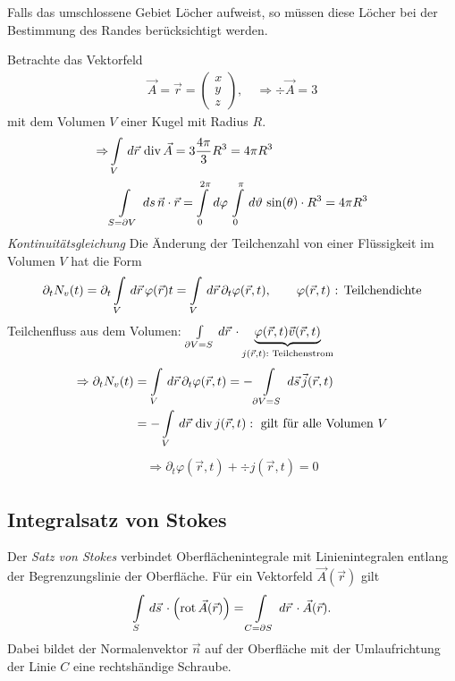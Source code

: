 \begin{Bemerkung}
Falls das umschlossene Gebiet Löcher aufweist, so müssen diese Löcher bei der
Bestimmung des Randes berücksichtigt werden.
\end{Bemerkung}

\begin{Beispiel}
Betrachte das Vektorfeld
\begin{align*}
\vec{A} = \vec{r} = \begin{pmatrix}x\\y\\z\end{pmatrix},\quad \Rightarrow \div
\vec{A} = 3
\end{align*}
mit dem Volumen $V$ einer Kugel mit Radius $R$.
\begin{align*}
\Rightarrow & \int \limits_{V} \,d\vec{r}\,  \operatorname{div} \vec{A} = 3\frac{4\pi}{3} R^3
= 4\pi R^3\\
& \int \limits_{S = \partial V} \,ds\, \vec{n}\cdot\vec{r} = \int \limits_{0}^{2\pi}\,d\varphi\, \int
\limits_{0}^{\pi}\,d\vartheta\, \sin(\theta) \cdot R^3 = 4\pi R^3
\end{align*}
{\em Kontinuitätsgleichung} Die Änderung der Teilchenzahl von einer Flüssigkeit
im Volumen $V$ hat die Form
\begin{align*}
\partial_t N_v(t) = \partial_t \int \limits_{V} \,d\vec{r}\, \varphi(\vec{r})t
= \int \limits_{V} \,d\vec{r}\, \partial_t \varphi(\vec{r}, t), \qquad
\varphi(\vec{r}, t) \text{ : Teilchendichte}
\end{align*}
Teilchenfluss aus dem Volumen: $\int \limits_{\partial V = S}\,d\vec{r}\, \cdot
\underbrace{\varphi(\vec{r},t)\vec{v}(\vec{r},t)}_{j(\vec{r},t) : \text{
Teilchenstrom}}$
\begin{align*}
\Rightarrow \partial_t N_v(t) &= \int \limits_{V} \,d\vec{r}\,
\partial_t\varphi(\vec{r},t) = -\int \limits_{\partial V = S}\,d\vec{s}\,
\vec{j}(\vec{r},t) \\
&= -\int \limits_{V}\,d\vec{r}\, \operatorname{div} j(\vec{r},t) : \text{
gilt für alle Volumen } V
\end{align*}
\begin{align*}
\Rightarrow \partial_t \varphi(\vec{r},t) + \div j(\vec{r},t) = 0
\end{align*}
\end{Beispiel}

\subsection{Integralsatz von Stokes}
Der {\em Satz von Stokes} verbindet Oberflächenintegrale mit Linienintegralen
entlang der Begrenzungslinie der Oberfläche. Für ein Vektorfeld
$\vec{A}(\vec{r})$ gilt
\begin{align*}
\int \limits_{S}\,d\vec{s}\, \cdot\left(\operatorname{rot} \vec{A}(\vec{r})\right) = \int
\limits_{C = \partial S} \,d\vec{r}\, \cdot \vec{A}(\vec{r}).
\end{align*}
Dabei bildet der Normalenvektor $\vec{n}$ auf der Oberfläche mit der
Umlaufrichtung der Linie $C$ eine rechtshändige Schraube.

